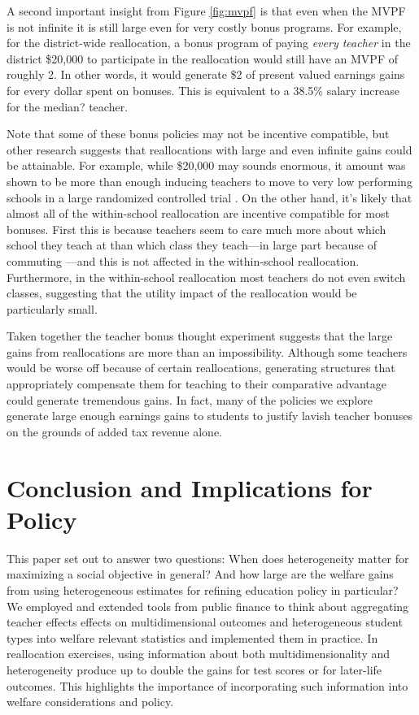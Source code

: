 \documentclass[12pt]{article}
\theoremstyle{definition}
\theoremstyle{definition}
\theoremstyle{definition}
\theoremstyle{definition}
\begin{document}
A second important insight from Figure \ref{fig:mvpf} is that even when the MVPF is not infinite it is still large even for very costly bonus programs. For example, for the district-wide reallocation, a bonus program of paying \textit{every teacher} in the district \$20,000 to participate in the reallocation would still have an MVPF of roughly 2. In other words, it would generate \$2 of present valued earnings gains for every dollar spent on bonuses. This is equivalent to a 38.5\% salary increase for the {\color{red}median?} teacher. 

Note that some of these bonus policies may not be incentive compatible, but other research suggests that reallocations with large and even infinite gains could be attainable. For example, while \$20,000 may sounds enormous, it amount was shown to be more than enough inducing teachers to move to very low performing schools in a large randomized controlled trial \citep{glazerman2013transfer}.
On the other hand, it's likely that almost all of the within-school reallocation are incentive compatible for most bonuses. First this is because teachers seem to care much more about which school they teach at than which class they teach---in large part because of commuting \citep{bates2022teacher}---and this is not affected in the within-school reallocation. Furthermore, in the within-school reallocation most teachers do not even switch classes, suggesting that the utility impact of the reallocation would be particularly small.


Taken together the teacher bonus thought experiment suggests that the large gains from reallocations are more than an impossibility. Although some teachers would be worse off because of certain reallocations, generating structures that appropriately compensate them for teaching to their comparative advantage could generate tremendous gains. In fact, many of the policies we explore generate large enough earnings gains to students to justify lavish teacher bonuses on the grounds of added tax revenue alone.


\section{Conclusion and Implications for Policy}
This paper set out to answer two questions: When does heterogeneity matter for maximizing a social objective in general? And how large are the welfare gains from using heterogeneous estimates for refining education policy in particular? We employed and extended  tools from public finance to think about aggregating teacher effects effects on multidimensional outcomes and heterogeneous student types into welfare relevant statistics and implemented them in practice. In reallocation exercises, using information about both multidimensionality and heterogeneity produce up to double the gains for test scores or for later-life outcomes. This highlights the importance of incorporating such information into welfare considerations and policy.
\end{document}
